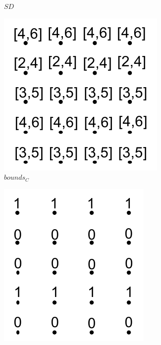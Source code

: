 \begin{figure}[!t]
\begin{subfigure}{0.18\linewidth}
\caption{$SD$}
\label{}
\end{subfigure}
\hspace{2mm}
\begin{subfigure}{0.18\linewidth}
\includegraphics[width=\linewidth]{Images/boundsC.pdf}
\caption{$bounds_{C}$}
\label{}
\end{subfigure}
\hspace{2mm}
\begin{subfigure}{0.18\linewidth}
\includegraphics[width=\linewidth]{Images/bvolumeTC.pdf}

\end{subfigure}
\end{figure}
